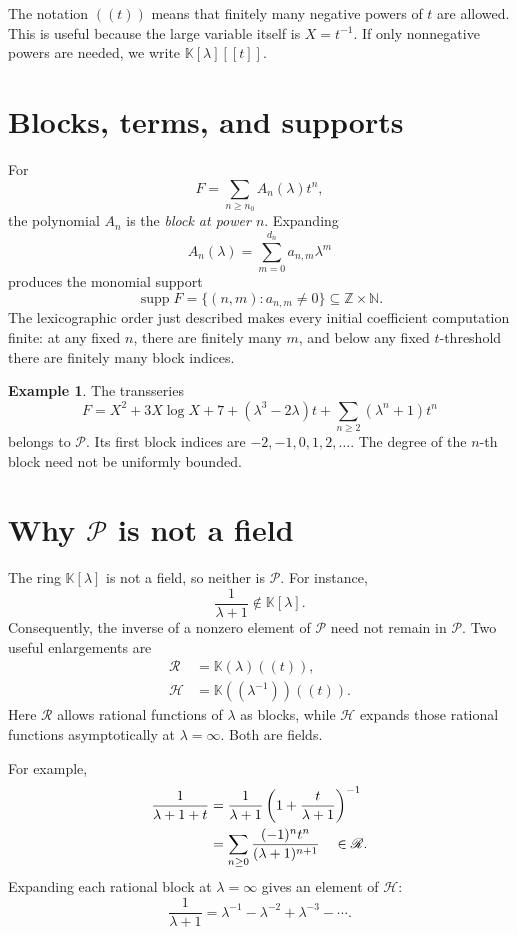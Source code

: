 \documentclass[11pt,openany]{book}
\theoremstyle{definition}
\newtheorem{example}{Example}[chapter]
\theoremstyle{plain}
\theoremstyle{remark}
\newcommand{\N}{\mathbb{N}}
\newcommand{\Z}{\mathbb{Z}}
\newcommand{\K}{\mathbb{K}}
\newcommand{\Plog}{\mathscr{P}}
\newcommand{\Rlog}{\mathscr{R}}
\newcommand{\Hlog}{\mathscr{H}}
\DeclareMathOperator{\supp}{supp}
\begin{document}
The notation \(((t))\) means that finitely many negative powers of \(t\) are allowed. This is useful because the large variable itself is \(X=t^{-1}\). If only nonnegative powers are needed, we write \(\K[\lambda][[t]]\).

\section{Blocks, terms, and supports}
For
\[
 F=\sum_{n\ge n_0}A_n(\lambda)t^n,
\]
the polynomial \(A_n\) is the \emph{block at power \(n\)}. Expanding
\[
 A_n(\lambda)=\sum_{m=0}^{d_n}a_{n,m}\lambda^m
\]
produces the monomial support
\[
 \supp F=\{(n,m):a_{n,m}\ne0\}\subseteq\Z\times\N.
\]
The lexicographic order just described makes every initial coefficient computation finite: at any fixed \(n\), there are finitely many \(m\), and below any fixed \(t\)-threshold there are finitely many block indices.

\begin{example}
The transseries
\[
 F=X^2+3X\log X+7+(\lambda^3-2\lambda)t
 +\sum_{n\ge2}(\lambda^n+1)t^n
\]
belongs to \(\Plog\). Its first block indices are \(-2,-1,0,1,2,\ldots\). The degree of the \(n\)-th block need not be uniformly bounded.
\end{example}

\section{Why \texorpdfstring{\(\Plog\)}{P} is not a field}
The ring \(\K[\lambda]\) is not a field, so neither is \(\Plog\). For instance,
\[
 \frac1{\lambda+1}\notin\K[\lambda].
\]
Consequently, the inverse of a nonzero element of \(\Plog\) need not remain in \(\Plog\). Two useful enlargements are
\begin{align}
 \Rlog&=\K(\lambda)((t)),\label{eq:Rlog}\\
 \Hlog&=\K((\lambda^{-1}))((t)).\label{eq:Hlog}
\end{align}
Here \(\Rlog\) allows rational functions of \(\lambda\) as blocks, while \(\Hlog\) expands those rational functions asymptotically at \(\lambda=\infty\). Both are fields.

For example,
\begin{align*}
 \frac1{\lambda+1+t}
 &=\frac1{\lambda+1}
 \left(1+\frac{t}{\lambda+1}\right)^{-1}\notag\\
 &=\sum_{n\ge0}\frac{(-1)^n t^n}{(\lambda+1)^{n+1}}
 \quad\in\Rlog.
\end{align*}
Expanding each rational block at \(\lambda=\infty\) gives an element of \(\Hlog\):
\[
 \frac1{\lambda+1}=\lambda^{-1}-\lambda^{-2}+\lambda^{-3}-\cdots.
\]
\end{document}
